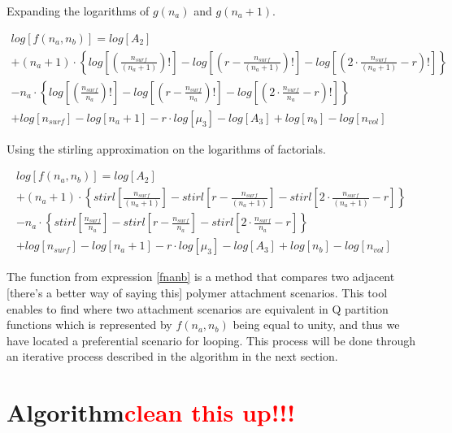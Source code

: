 \documentclass[10pt,letterpaper]{article}
\newcommand{\nads}[1]{
    \ensuremath{
        \frac{
            n_{surf}
        }{
            #1
        }
    }
}
\newcommand{\nlp}[1]{
    \ensuremath{
        r
        -
        \nads{#1}
    }
}
\newcommand{\logOFgOFm}[1]{
	\ensuremath{
	#1
	\cdot
	\left\{
    	log
    	\left[
    	    \left(
    	        \nads{#1}
    	    \right)!
    	\right]
    	-
    	log
    	\left[
        	\left(
        	    \nlp{#1}
        	\right)!
    	\right]
    	-
    	log
    	\left[
    	    \left(
        	    2
        	    \cdot
        	    \nads{#1}
        	    -
        	    r
            \right)!
    	\right]
	\right\}
	}
}
\newcommand{\StirlOFgOFm}[1]{
	\ensuremath{
	#1
	\cdot
	\left\{
    	stirl
    	\left[
    	        \nads{#1}
    	\right]
    	-
    	stirl
    	\left[
        	    \nlp{#1}
    	\right]
    	-
    	stirl
    	\left[
        	    2
        	    \cdot
        	    \nads{#1}
        	    -
        	    r
    	\right]
	\right\}
	}
}
\begin{document}
\noindent Expanding the logarithms of $g(n_a)$ and $g(n_a +1)$.

\begin{multline}
	log
	\left[
	    f(n_a,n_b)
	\right]
	=
	log
	\left[
		A_2
	\right]\\
	+
	\logOFgOFm{(n_a+1)}\\
    -
    \logOFgOFm{n_a}\\
	+
	log
	\left[
		n_{surf}
	\right]
		-
		log
		\left[
		n_a+1
		\right]
		-
		r
		\cdot
		log
		\left[
		\mu_{3}
		\right]
		-
		log
		\left[
		A_3
		\right]
		+
		log
		\left[
		n_{b}
		\right]
		-
		log
		\left[
		n_{vol}	
	\right]
		\label{logfexpnd1}
\end{multline}


\noindent Using the stirling approximation on the logarithms of factorials.

\begin{multline}
	log
	\left[
	    f(n_a,n_b)
	\right]
	=
	log
	\left[
		A_2
	\right]\\
	+
	\StirlOFgOFm{(n_a+1)}\\
    -
    \StirlOFgOFm{n_a}\\
	+
	log
	\left[
		n_{surf}
	\right]
		-
		log
		\left[
		n_a+1
		\right]
		-
		r
		\cdot
		log
		\left[
		\mu_{3}
		\right]
		-
		log
		\left[
		A_3
		\right]
		+
		log
		\left[
		n_{b}
		\right]
		-
		log
		\left[
		n_{vol}	
	\right]
		\label{stirlOFexpnd1}
\end{multline}

\noindent The function from expression \ref{fnanb} is a method that compares two adjacent [there's a better way of saying this] polymer attachment scenarios. This tool enables to find where two attachment scenarios are equivalent in Q partition functions which is represented by $f(n_a,n_b)$ being equal to unity, and thus we have located a preferential scenario for looping. This process will be done through an iterative process described in the algorithm in the next section.

\section*{Algorithm\textcolor{red}{clean this up!!!}}


\end{document}

